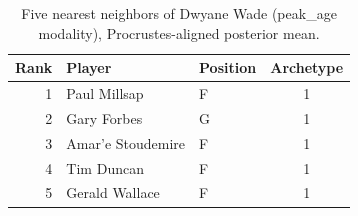 \begin{table}[htbp]
  \centering\small
  \begin{tabular}{rllc}
    \toprule
    Rank & Player & Position & Archetype \\
    \midrule
    1 & Paul Millsap & F & 1 \\
    2 & Gary Forbes & G & 1 \\
    3 & Amar'e Stoudemire & F & 1 \\
    4 & Tim Duncan & F & 1 \\
    5 & Gerald Wallace & F & 1 \\
    \bottomrule
  \end{tabular}
  \caption{Five nearest neighbors of Dwyane Wade (peak_age modality), Procrustes-aligned posterior mean.}
  \label{tab:Dwyane_Wade_neighbors_peak_age}
\end{table}

